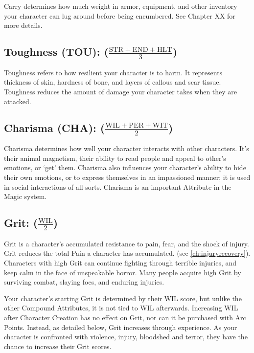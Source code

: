 \documentclass[oneside,11pt,english]{book}
\begin{document}
Carry determines how much weight in armor, equipment, and other inventory your character can lug 
around before being encumbered. See Chapter XX for more details. 

 

\subsection*{Toughness (TOU): ($\frac{\mathrm{STR+END+HLT}}{3} $)}
Toughness refers to how resilient your character is to harm. It represents thickness of skin, hardness of 
bone, and layers of callous and scar tissue. Toughness reduces the amount of damage your character takes 
when they are attacked. 

 

\subsection*{Charisma (CHA): ($\frac{\mathrm{WIL+PER+WIT}} {2}$)}
Charisma determines how well your character interacts with other characters. It’s their animal magnetism, 
their ability to read people and appeal to other’s emotions, or ‘get’ them. Charisma also influences your 
character’s ability to hide their own emotions, or to express themselves in an impassioned manner; it is 
used in social interactions of all sorts. Charisma is an important Attribute in the Magic system. 

 

\subsection*{Grit: ($\frac{\mathrm{WIL}}{2}$)} 
Grit is a character’s accumulated resistance to pain, fear, and the shock of injury. Grit reduces the total Pain a character has accumulated. (see \autoref{ch:injuryrecovery}). Characters with high Grit can continue fighting 
through terrible injuries, and keep calm in the face of unspeakable horror. Many people acquire high Grit 
by surviving combat, slaying foes, and enduring injuries. 


Your character’s starting Grit is determined by their WIL score, but unlike the other Compound 
Attributes, it is not tied to WIL afterwards. Increasing WIL after Character Creation has no effect on Grit, 
nor can it be purchased with Arc Points. Instead, as detailed below, Grit increases through experience. As 
your character is confronted with violence, injury, bloodshed and terror, they have the chance to increase 
their Grit scores. 
 
\end{document}
